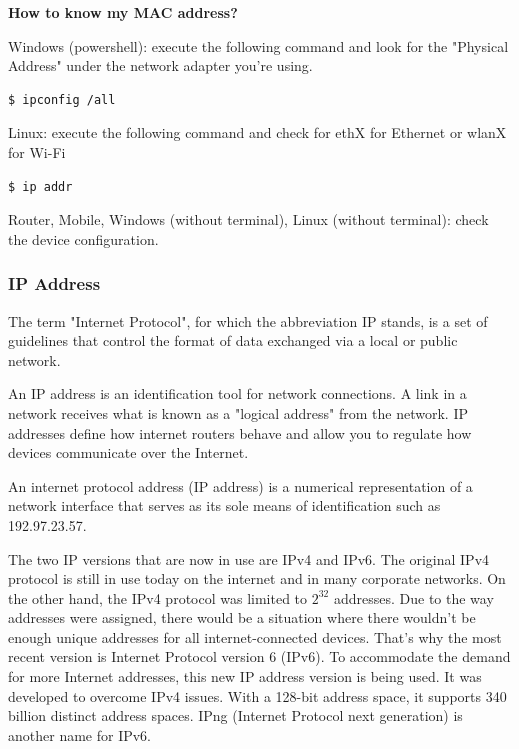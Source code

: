 \documentclass{article}
\newenvironment{codetemplate}[1][]{%
  \mybasecolorbox[#1]
  \itshape
}{%
  \endmybasecolorbox
}
\begin{document}
\textbf{How to know my MAC address?}


Windows (powershell): execute the following command and look for the "Physical Address" under the network adapter you're using. 
\begin{codetemplate}{}
\begin{verbatim}
$ ipconfig /all
\end{verbatim}
\end{codetemplate}

Linux: execute the following command and check for ethX for Ethernet or wlanX for Wi-Fi
\begin{codetemplate}{}
\begin{verbatim}
$ ip addr
\end{verbatim}
\end{codetemplate}

Router, Mobile, Windows (without terminal), Linux (without terminal): check the device configuration.

\subsubsection{IP Address}

The term "Internet Protocol", for which the abbreviation IP stands, is a set of guidelines that control the format of data exchanged via a local or public network.

An IP address is an identification tool for network connections. A link in a network receives what is known as a "logical address" from the network. IP addresses define how internet routers behave and allow you to regulate how devices communicate over the Internet.

An internet protocol address (IP address) is a numerical representation of a network interface that serves as its sole means of identification such as 192.97.23.57.

The two IP versions that are now in use are IPv4 and IPv6. The original IPv4 protocol is still in use today on the internet and in many corporate networks. On the other hand, the IPv4 protocol was limited to $2^{32}$ addresses. Due to the way addresses were assigned, there would be a situation where there wouldn't be enough unique addresses for all internet-connected devices. That's why the most recent version is Internet Protocol version 6 (IPv6). To accommodate the demand for more Internet addresses, this new IP address version is being used. It was developed to overcome IPv4 issues. With a 128-bit address space, it supports 340 billion distinct address spaces. IPng (Internet Protocol next generation) is another name for IPv6.
\end{document}
